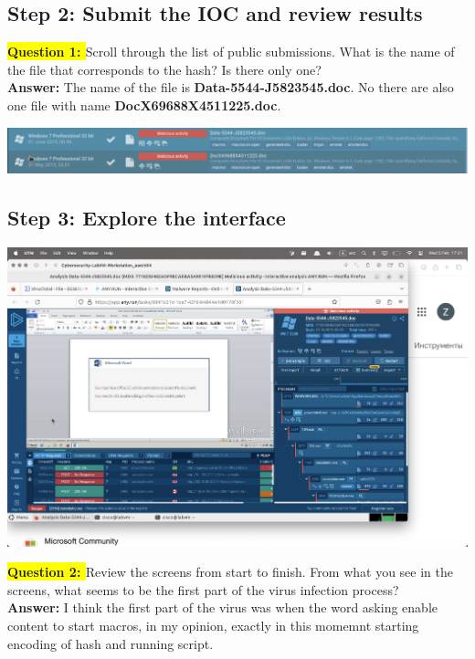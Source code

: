 \documentclass{article}
\begin{document}
\subsection*{Step 2: Submit the IOC and review results}

\textbf{\colorbox{yellow}{Question 1: }} Scroll through the list of public submissions. What is the name of the file that corresponds to the hash? Is there only one? \\
\textbf{Answer: } The name of the file is \textbf{Data-5544-J5823545.doc}. No there are also one file with name \textbf{DocX69688X4511225.doc}.

\vspace{1\baselineskip}

\includegraphics[width=1\textwidth]{8.png}

\subsection*{Step 3: Explore the interface}

\includegraphics[width=1\textwidth]{9.png}

\textbf{\colorbox{yellow}{Question 2: }} Review the screens from start to finish. From what you see in the screens, what seems to be the first part of the virus infection process? \\
\textbf{Answer: } I think the first part of the virus was when the word asking enable content to start macros, in my opinion, exactly in this momemnt starting encoding of hash and running script. \\
\end{document}
